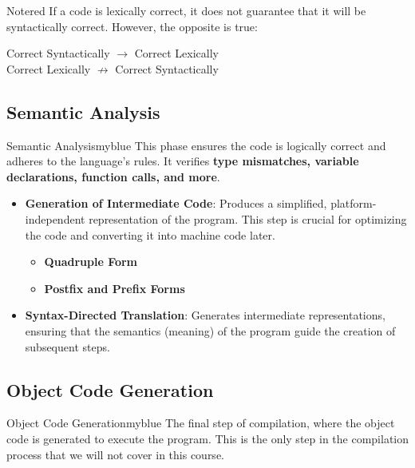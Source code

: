 \newpage

\begin{prettyBox}{Note}{red}
If a code is lexically correct, it does not guarantee that it will be syntactically correct. However, the opposite is true:

\begin{center}
    Correct Syntactically $\rightarrow$ Correct Lexically \\[0.15cm]
    Correct Lexically $\nrightarrow$ Correct Syntactically
\end{center}

\end{prettyBox}

\vspace{0.35cm}

\subsection{Semantic Analysis}
\begin{prettyBox}{Semantic Analysis}{myblue}
This phase ensures the code is logically correct and adheres to the language's rules. It verifies \textbf{type mismatches, variable declarations, function calls, and more}.

\begin{itemize}
    \item \textbf{Generation of Intermediate Code}: 
    Produces a simplified, platform-independent representation of the program. This step is crucial for optimizing the code and converting it into machine code later.
    \begin{itemize}
        \item \textbf{Quadruple Form}
        \item \textbf{Postfix and Prefix Forms}
    \end{itemize}

    \item \textbf{Syntax-Directed Translation}: 
    Generates intermediate representations, ensuring that the semantics (meaning) of the program guide the creation of subsequent steps.
\end{itemize}
\end{prettyBox}

\vspace{0.35cm}
\subsection{Object Code Generation}

\begin{prettyBox}{Object Code Generation}{myblue}
The final step of compilation, where the object code is generated to execute the program.
This is the only step in the compilation process that we will not cover in this course.
\end{prettyBox}

